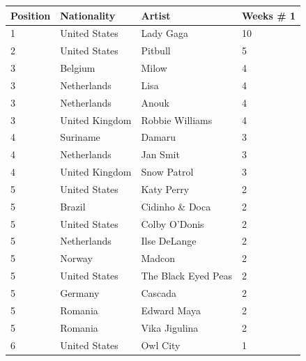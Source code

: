 \documentclass{article}
\begin{document}
\begin{tabular}{llll}
\toprule
Position & Nationality & Artist & Weeks \# 1 \\
\midrule
1 & United States & Lady Gaga & 10 \\
2 & United States & Pitbull & 5 \\
3 & Belgium & Milow & 4 \\
3 & Netherlands & Lisa & 4 \\
3 & Netherlands & Anouk & 4 \\
3 & United Kingdom & Robbie Williams & 4 \\
4 & Suriname & Damaru & 3 \\
4 & Netherlands & Jan Smit & 3 \\
4 & United Kingdom & Snow Patrol & 3 \\
5 & United States & Katy Perry & 2 \\
5 & Brazil & Cidinho \& Doca & 2 \\
5 & United States & Colby O'Donis & 2 \\
5 & Netherlands & Ilse DeLange & 2 \\
5 & Norway & Madcon & 2 \\
5 & United States & The Black Eyed Peas & 2 \\
5 & Germany & Cascada & 2 \\
5 & Romania & Edward Maya & 2 \\
5 & Romania & Vika Jigulina & 2 \\
6 & United States & Owl City & 1 \\
\bottomrule
\end{tabular}
\end{document}
